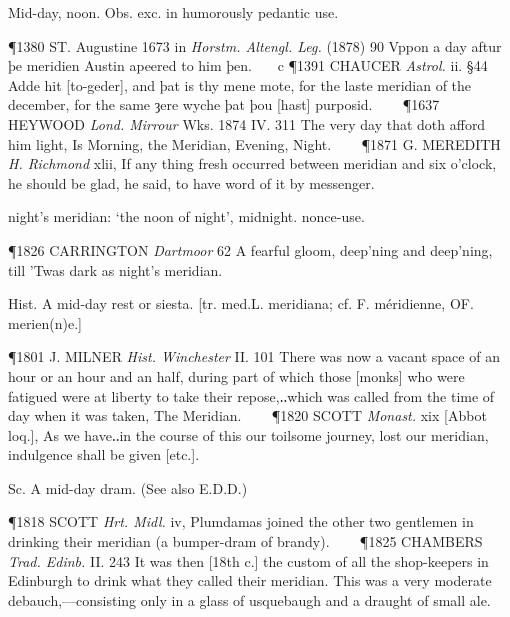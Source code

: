 \begin{description}[wide, labelwidth=!, labelindent=0pt]
\noindent {}

\noindent [From various elliptical uses of meridian a., chiefly adopted from OF. or med.L.

   Cf. L. merīdiānum (sc. tempus), noon; merīdiānum, the south; med.L. meridiāna (OF. méridiane, earlier meriene; mod.F. méridienne), noon, midday rest, siesta; F. méridien = sense 4 below; méridienne (= ligne m.), a meridian line.]
\vspace{-0.3cm}

\begin{myenumerate}
 Mid-day, noon. Obs. exc. in humorously pedantic use.

\P 1380 ST. Augustine 1673 in  \textit{Horstm. Altengl. Leg.} (1878) 90 Vppon a day aftur þe meridien Austin apeered to him þen.    c 
\P 1391 CHAUCER  \textit{Astrol.} ii. §44 Adde hit [to-geder], and þat is thy mene mote, for the laste meridian of the december, for the same ȝere wyche þat þou [hast] purposid.    
\P 1637 HEYWOOD  \textit{Lond. Mirrour} Wks. 1874 IV. 311  The very day that doth afford him light, Is Morning, the Meridian, Evening, Night.    
\P 1871 G. MEREDITH  \textit{H. Richmond} xlii, If any thing fresh occurred between meridian and six o'clock, he should be glad, he said, to have word of it by messenger.

 night's meridian: ‘the noon of night’, midnight. nonce-use.

\P 1826 CARRINGTON  \textit{Dartmoor} 62 A fearful gloom, deep'ning and deep'ning, till 'Twas dark as night's meridian.

 Hist. A mid-day rest or siesta. [tr. med.L. meridiana; cf. F. méridienne, OF. merien(n)e.]

\P 1801 J. MILNER  \textit{Hist. Winchester} II. 101 There was now a vacant space of an hour or an hour and an half, during part of which those [monks] who were fatigued were at liberty to take their repose,‥which was called from the time of day when it was taken, The Meridian.    
\P 1820 SCOTT  \textit{Monast.} xix [Abbot loq.], As we have‥in the course of this our toilsome journey, lost our meridian, indulgence shall be given [etc.].

 Sc. A mid-day dram. (See also E.D.D.)

\P 1818 SCOTT  \textit{Hrt. Midl.} iv, Plumdamas joined the other two gentlemen in drinking their meridian (a bumper-dram of brandy).    
\P 1825 CHAMBERS  \textit{Trad. Edinb.} II. 243 It was then [18th c.] the custom of all the shop-keepers in Edinburgh to drink what they called their meridian. This was a very moderate debauch,—consisting only in a glass of usquebaugh and a draught of small ale.


\end{myenumerate}
\end{description}
